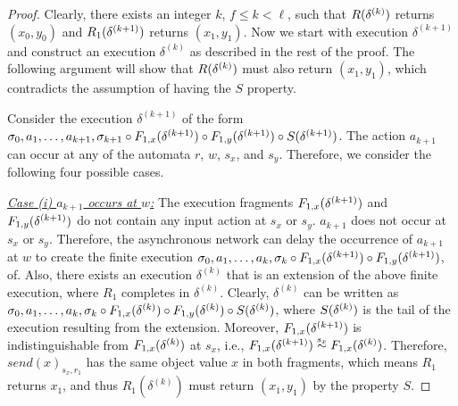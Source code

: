 \begin{proof}
Clearly, there exists an integer $k$,  $ f \leq  k < \ell$, such that $\frage{R}{\delta^{(k)}}{}$ returns $(x_0, y_0)$ and $\frage{R_1}{\delta^{(k+1)}}{}$ returns $(x_1, y_1)$. Now we start with execution 
$\delta^{(k+1)}$ and construct an execution $\delta^{(k)}$ as described in the rest of the proof. The following argument will show that  $\frage{R}{\delta^{(k)}}{}$ must also return $(x_1, y_1)$, which contradicts the assumption of having the $S$ property.

Consider the execution $\delta^{(k+1)}$ of the form 
$\finiteprefix{k}{k +1} \circ \frag{1,x}{\delta^{(k+1)}} \circ \frag{1,y}{\delta^{(k+1)}} \circ \suffix{\delta^{(k+1)}}$. 
 The action  $a_{k+1}$ can  occur at any of the automata $r$, $w$, $s_x$, and $s_y$. Therefore, we consider the following four possible cases.
%

\emph{ \underline{Case (i) $a_{k+1}$ occurs at $w$:}} The execution fragments
 $\frag{1,x}{\delta^{(k+1)}}$ and $\frag{1,y}{\delta^{(k+1)}}$ do not contain any input action  at $s_x$ or $s_y$. $a_{k+1}$ does not occur at $s_x$ or $s_y$. 
 Therefore,
 the asynchronous network can
  delay the occurrence of $a_{k+1}$ at $w$ to create the 
   finite execution   
$\finiteprefix{k-1}{k } \circ \frag{1,x}{\delta^{(k+1)}} \circ \frag{1,y}{\delta^{(k+1)}}$,  
 of. Also, there exists an execution $\delta^{(k)}$ that
 is an extension of the above finite execution, where $R_1$ completes in $\delta^{(k)}$.
%
  Clearly, $\delta^{(k)}$ can be written as  
 $\finiteprefix{k-1}{k } \circ \frag{1,x}{\delta^{(k)}} \circ \frag{1,y}{\delta^{(k)}} \circ \suffix{\delta^{(k)}}$, where $ \suffix{\delta^{(k)}}$ is the tail of the execution resulting from the extension. Moreover,  
  $\frag{1,x}{\delta^{(k+1)}}$   is indistinguishable  from   
  $\frag{1,x}{\delta^{(k)}}$ at $s_x$, i.e., 
      $\frag{1,x}{\delta^{(k+1)}} \stackrel{s_x}{\sim} \frag{1,x}{\delta^{(k)}}$. 
   Therefore, $send(x)_{s_x, r_1}$ has the same object value 
   $x$ in both fragments, which means $R_1$ returns $x_1$, and thus $R_1(\delta^{(k)})$ must return $(x_1, y_1)$ by the property $S$.
   

\end{proof}
